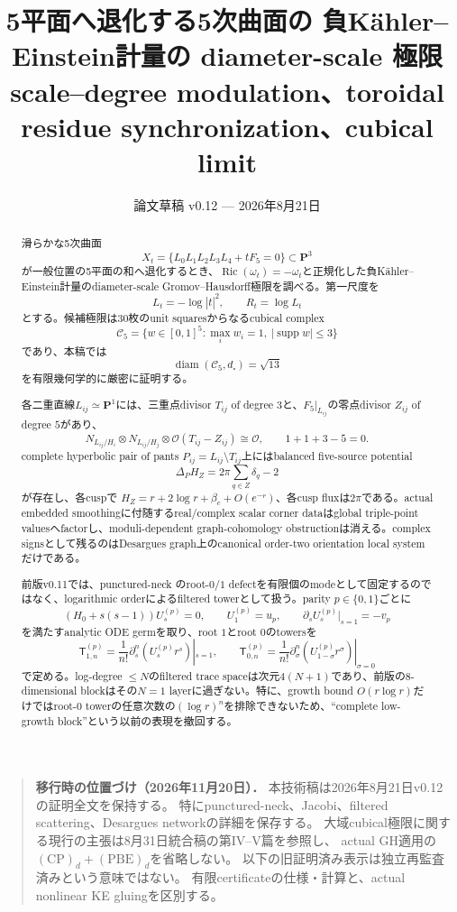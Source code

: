 \documentclass[11pt,a4paper]{ltjsarticle}
\title{\bfseries 5平面へ退化する5次曲面の\newline
負Kähler--Einstein計量の diameter-scale 極限\\[4mm]
\large scale--degree modulation、toroidal residue synchronization、cubical limit}
\author{}
\date{論文草稿 v0.12 --- 2026年8月21日}
\theoremstyle{definition}
\theoremstyle{remark}
\newcommand{\PP}{\mathbf P}
\newcommand{\diam}{\operatorname{diam}}
\newcommand{\Ric}{\operatorname{Ric}}
\newcommand{\supp}{\operatorname{supp}}
\begin{document}
\maketitle

\begin{quote}\small
\textbf{移行時の位置づけ（2026年11月20日）．}
本技術稿は2026年8月21日v0.12の証明全文を保持する。
特にpunctured-neck、Jacobi、filtered scattering、Desargues networkの詳細を保存する。
大域cubical極限に関する現行の主張は8月31日統合稿の第IV--V篇を参照し、
actual GH適用の$(\mathrm{CP})_d+(\mathrm{PBE})_d$を省略しない。
以下の旧証明済み表示は独立再監査済みという意味ではない。
有限certificateの仕様・計算と、actual nonlinear KE gluingを区別する。
\end{quote}


\begin{abstract}
滑らかな5次曲面
\[
 X_t=\{L_0L_1L_2L_3L_4+tF_5=0\}\subset\PP^3
\]
が一般位置の5平面の和へ退化するとき、$\Ric(\omega_t)=-\omega_t$と正規化した負Kähler--Einstein計量のdiameter-scale Gromov--Hausdorff極限を調べる。第一尺度を
\[
 L_t=-\log|t|^2,\qquad R_t=\log L_t
\]
とする。候補極限は30枚のunit squaresからなるcubical complex
\[
 \mathcal C_5
 =\{w\in[0,1]^5:\max_iw_i=1,\ |\supp w|\le3\}
\]
であり、本稿では
\[
 \diam(\mathcal C_5,d_\square)=\sqrt{13}
\]
を有限幾何学的に厳密に証明する。

各二重直線$L_{ij}\simeq\PP^1$には、三重点divisor $T_{ij}$ of degree $3$と、$F_5|_{L_{ij}}$の零点divisor $Z_{ij}$ of degree $5$があり、
\[
 N_{L_{ij}/H_i}\otimes N_{L_{ij}/H_j}
 \otimes\mathcal O(T_{ij}-Z_{ij})\cong\mathcal O,
 \qquad 1+1+3-5=0.
\]
complete hyperbolic pair of pants
$P_{ij}=L_{ij}\setminus T_{ij}$上にはbalanced five-source potential
\[
 \Delta_PH_Z=2\pi\sum_{q\in Z}\delta_q-2
\]
が存在し、各cuspで
$H_Z=r+2\log r+\beta_c+O(e^{-r})$、各cusp fluxは$2\pi$である。actual embedded smoothingに付随するreal/complex scalar corner dataはglobal triple-point valuesへfactorし、moduli-dependent graph-cohomology obstructionは消える。complex signsとして残るのはDesargues graph上のcanonical order-two orientation local systemだけである。

前版v0.11では、punctured-neck のroot-$0/1$ defectを有限個のmodeとして固定するのではなく、logarithmic orderによるfiltered towerとして扱う。parity $p\in\{0,1\}$ごとに
\[
 (H_0+s(s-1))U_s^{(p)}=0,
 \qquad U_1^{(p)}=u_p,
 \qquad \partial_sU_s^{(p)}|_{s=1}=-v_p
\]
を満たすanalytic ODE germを取り、root $1$とroot $0$のtowersを
\[
 \mathsf T_{1,n}^{(p)}
 =\frac1{n!}\partial_s^n(U_s^{(p)}r^s)|_{s=1},
 \qquad
 \mathsf T_{0,n}^{(p)}
 =\frac1{n!}\partial_\sigma^n
   (U_{1-\sigma}^{(p)}r^\sigma)|_{\sigma=0}
\]
で定める。log-degree $\le N$のfiltered trace spaceは次元$4(N+1)$であり、前版の8-dimensional blockはその$N=1$ layerに過ぎない。特に、growth bound $O(r\log r)$だけではroot-$0$ towerの任意次数の$(\log r)^n$を排除できないため、``complete low-growth block''という以前の表現を撤回する。


\end{abstract}
\end{document}
